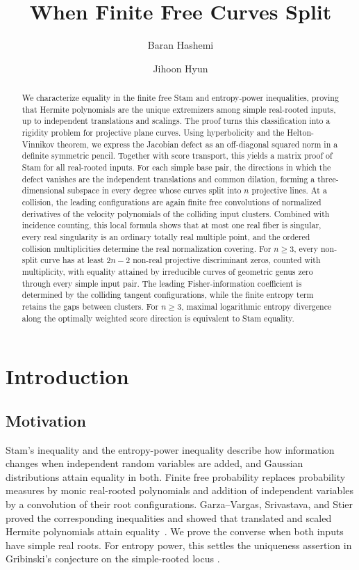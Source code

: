 \documentclass[12pt,reqno]{amsart}
\title[When Finite Free Curves Split]{When Finite Free Curves Split}
\author{Baran Hashemi}
\author{Jihoon Hyun}
\theoremstyle{definition}
\theoremstyle{remark}
\begin{document}
\begin{abstract}
We characterize equality in the finite free Stam and entropy-power inequalities, proving that Hermite polynomials are the unique extremizers among simple real-rooted inputs, up to independent translations and scalings. The proof turns this classification into a rigidity problem for projective plane curves. Using hyperbolicity and the Helton-Vinnikov theorem, we express the Jacobian defect as an off-diagonal squared norm in a definite symmetric pencil. Together with score transport, this yields a matrix proof of Stam for all real-rooted inputs. For each simple base pair, the directions in which the defect vanishes are the independent translations and common dilation, forming a three-dimensional subspace in every degree whose curves split into $n$ projective lines. At a collision, the leading configurations are again finite free convolutions of normalized derivatives of the velocity polynomials of the colliding input clusters. Combined with incidence counting, this local formula shows that at most one real fiber is singular, every real singularity is an ordinary totally real multiple point, and the ordered collision multiplicities determine the real normalization covering. For $n\geq3$, every non-split curve has at least $2n-2$ non-real projective discriminant zeros, counted with multiplicity, with equality attained by irreducible curves of geometric genus zero through every simple input pair. The leading Fisher-information coefficient is determined by the colliding tangent configurations, while the finite entropy term retains the gaps between clusters. For $n\geq3$, maximal logarithmic entropy divergence along the optimally weighted score direction is equivalent to Stam equality.
\end{abstract}

\maketitle

\section{Introduction}\label{sec:introduction}

\subsection{Motivation}
Stam's inequality and the entropy-power inequality describe how information changes when independent random variables are added, and Gaussian distributions attain equality in both. Finite free probability replaces probability measures by monic real-rooted polynomials and addition of independent variables by a convolution of their root configurations. Garza--Vargas, Srivastava, and Stier
proved the corresponding inequalities and showed that translated
and scaled Hermite polynomials attain equality~\cite{GVS26}. We prove the converse when both inputs have simple real roots. For entropy power, this settles the uniqueness assertion in Gribinski's conjecture on the simple-rooted locus
\cite[Conjecture~1]{Gribinski19}.
\end{document}
